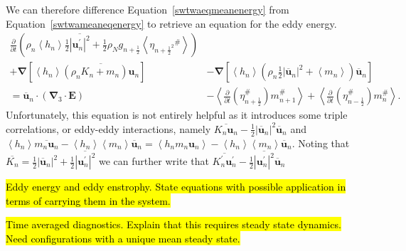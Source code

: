 \documentclass[12pt,a4paper]{report}
\newcommand*\thkmean[1]{\overline{#1}}
\newcommand*\thkres[1]{{#1}^{\prime}}
\newcommand*\nthkmean[1]{\left\langle{#1}\right\rangle}
\newcommand*\nthkres[1]{{#1}^{\#}}
\newcommand*\equref[1]{Equation~\eqref{#1}}
\newcommand*{\half}{\frac{1}{2}}
\begin{document}
    We can therefore difference \equref{swtwaeqmeanenergy} from
    \equref{swtwameaneqenergy} to retrieve an equation
    for the eddy energy.
        \begin{equation}
        \begin{split}
            \frac{\partial}{\partial t}\left(\rho_{n} \nthkmean{h_{n}} \half\thkmean{ \left|\thkres{\boldsymbol{u}}_{n}\right|^{2}}+ 
            \half \rho_{N} g_{n+\half }\nthkmean{\nthkres{\eta_{n+\half ^{2}}}} \right)
            &\\
            +\boldsymbol{\nabla} \left[\nthkmean{h_{n}} \thkmean{\left(\rho_{n}K_{n}+m_{n}\right) \boldsymbol{u}_{n}}\right] &-\boldsymbol{\nabla} \left[\nthkmean{h_{n}} \left(\rho_{n}\half \left|\thkmean{\boldsymbol{u}}_{n}\right|^{2}+\nthkmean{m_{n}}\right) \thkmean{\boldsymbol{u}}_{n}\right]\\
            =\thkmean{\boldsymbol{u}}_{n} \cdot \left(\boldsymbol{\nabla}_{3}\cdot \boldsymbol{E}\right)
            &- \nthkmean{\frac{\partial}{\partial t}\left(\nthkres{\eta}_{n+\half }\right)   \nthkres{m}_{n+1}}
            + \nthkmean{\frac{\partial}{\partial t}\left(\nthkres{\eta}_{n-\half }\right) \nthkres{m}_{n}}.
          \end{split}
        \end{equation}
        Unfortunately, this equation is not entirely helpful as it
        introduces some triple correlations, or eddy-eddy interactions,
        namely $\thkmean{K_{n} \boldsymbol{u}_{n}}
        -\half \left|\thkmean{\boldsymbol{u}}_{n}\right|^{2}
        \thkmean{\boldsymbol{u}}_{n}$ and 
        $\nthkmean{h_{n}}\thkmean{m_{n}\boldsymbol{u}_{n}}
        -\nthkmean{h_{n}} \nthkmean{m_{n}}\thkmean{\boldsymbol{u}}_{n}
         = \nthkmean{h_{n}m_{n}\boldsymbol{u}_{n}}
        -\nthkmean{h_{n}}\nthkmean{m_{n}}\thkmean{\boldsymbol{u}}_{n}$.
        Noting that $\thkmean{K_{n}} = \half \left|\thkmean{\boldsymbol{u}}_{n}\right|^{2} +
        \half \thkmean{\left|\thkres{\boldsymbol{u}}_{n}\right|^{2}}$
        we can further write that 
        $\thkmean{\thkres{K}_{n} \thkres{\boldsymbol{u}}_{n}}
                -\half \thkmean{\left|\thkres{\boldsymbol{u}}_{n}\right|^{2}}
                \thkmean{\boldsymbol{u}}_{n}$ 
                 
            
    \hl{Eddy energy and eddy enstrophy. State equations with 
    possible application in terms of carrying them in the system.}
    
    \hl{Time averaged diagnostics. Explain that this 
    requires steady state dynamics. Need configurations
    with a unique mean steady state.}
    
\end{document}
